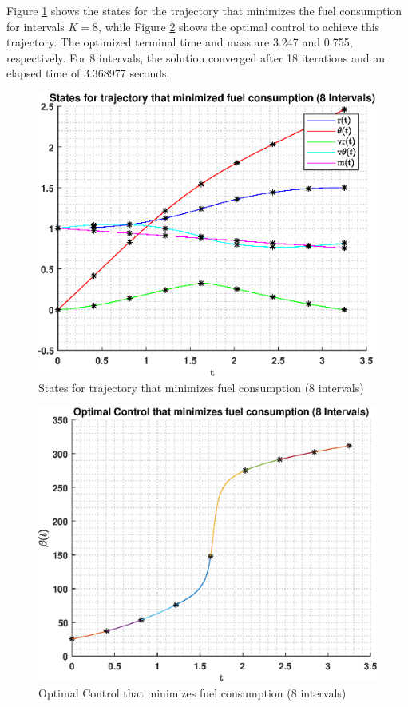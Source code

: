 \documentclass[]{article}
\begin{document}
Figure \ref{fig:indirectMultiStates8} shows the states for the trajectory that minimizes the fuel consumption for intervals \(K = 8\), while Figure \ref{fig:indirectMultiControl8} shows the optimal control to achieve this trajectory. The optimized terminal time and mass are 3.247 and 0.755, respectively. For 8 intervals, the solution converged after 18 iterations and an elapsed time of 3.368977 seconds. 
\begin{figure}
	\centering
	\includegraphics[scale=0.75]{indirectMultiStates8.eps}
	\caption{States for trajectory that minimizes fuel consumption (8 intervals)}
	\label{fig:indirectMultiStates8}
\end{figure}
\begin{figure}
	\centering
	\includegraphics[scale=0.75]{indirectMultiControl8.eps}
	\caption{Optimal Control that minimizes fuel consumption (8 intervals)}
	\label{fig:indirectMultiControl8}
\end{figure}
\FloatBarrier
\end{document}
